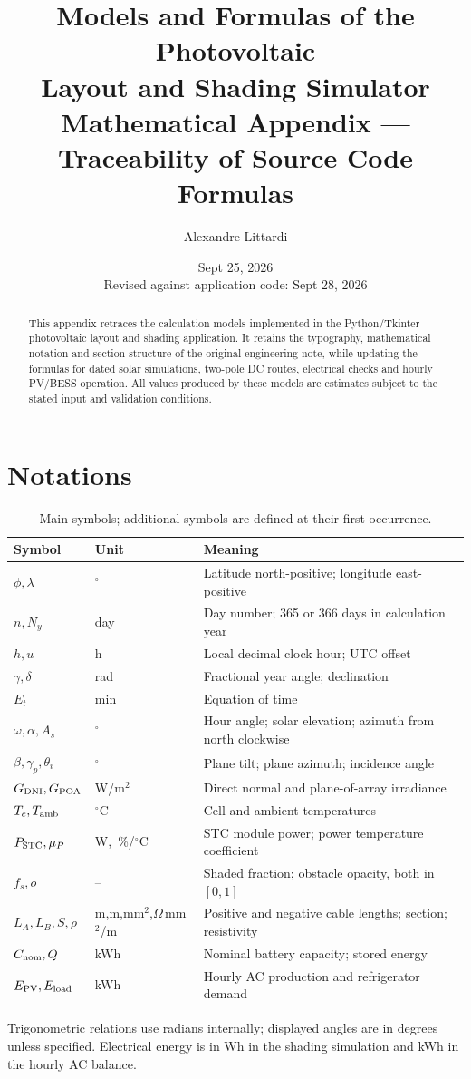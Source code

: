 \documentclass[10pt,a4paper]{article}
\title{Models and Formulas of the Photovoltaic\\Layout and Shading Simulator\\
 \large Mathematical Appendix --- Traceability of Source Code Formulas}
\author{Alexandre Littardi}
\date{Sept 25, 2026\\[4pt]\small Revised against application code: Sept 28, 2026}
\begin{document}
\maketitle
\begin{abstract}
This appendix retraces the calculation models implemented in the Python/Tkinter photovoltaic
layout and shading application. It retains the typography, mathematical notation and section
structure of the original engineering note, while updating the formulas for dated solar
simulations, two-pole DC routes, electrical checks and hourly PV/BESS operation.
All values produced by these models are estimates subject to the stated input and validation
conditions.
\end{abstract}
\newpage
\begingroup\small\tableofcontents\endgroup
\newpage
\section{Notations}
\begin{table}[h]
\centering\small
\begin{tabular}{@{}llp{8.0cm}@{}}
\toprule
Symbol & Unit & Meaning\\ \midrule
$\phi,\lambda$ & $^\circ$ & Latitude north-positive; longitude east-positive\\
$n,N_y$ & day & Day number; 365 or 366 days in calculation year\\
$h,u$ & h & Local decimal clock hour; UTC offset\\
$\gamma,\delta$ & rad & Fractional year angle; declination\\
$E_t$ & min & Equation of time\\
$\omega,\alpha,A_s$ & $^\circ$ & Hour angle; solar elevation; azimuth from north clockwise\\
$\beta,\gamma_p,\theta_i$ & $^\circ$ & Plane tilt; plane azimuth; incidence angle\\
$G_{\rm DNI},G_{\rm POA}$ & W/m$^2$ & Direct normal and plane-of-array irradiance\\
$T_c,T_{\rm amb}$ & $^\circ$C & Cell and ambient temperatures\\
$P_{\rm STC},\mu_P$ & W,\ \%/$^\circ$C & STC module power; power temperature coefficient\\
$f_s,o$ & -- & Shaded fraction; obstacle opacity, both in $[0,1]$\\
$L_A,L_B,S,\rho$ & m,m,mm$^2$,$\Omega$\,mm$^2$/m & Positive and negative cable lengths; section; resistivity\\
$C_{\rm nom},Q$ & kWh & Nominal battery capacity; stored energy\\
$E_{\rm PV},E_{\rm load}$ & kWh & Hourly AC production and refrigerator demand\\
\bottomrule
\end{tabular}
\caption{Main symbols; additional symbols are defined at their first occurrence.}
\end{table}
Trigonometric relations use radians internally; displayed angles are in degrees unless specified.
Electrical energy is in Wh in the shading simulation and kWh in the hourly AC balance.
\end{document}
